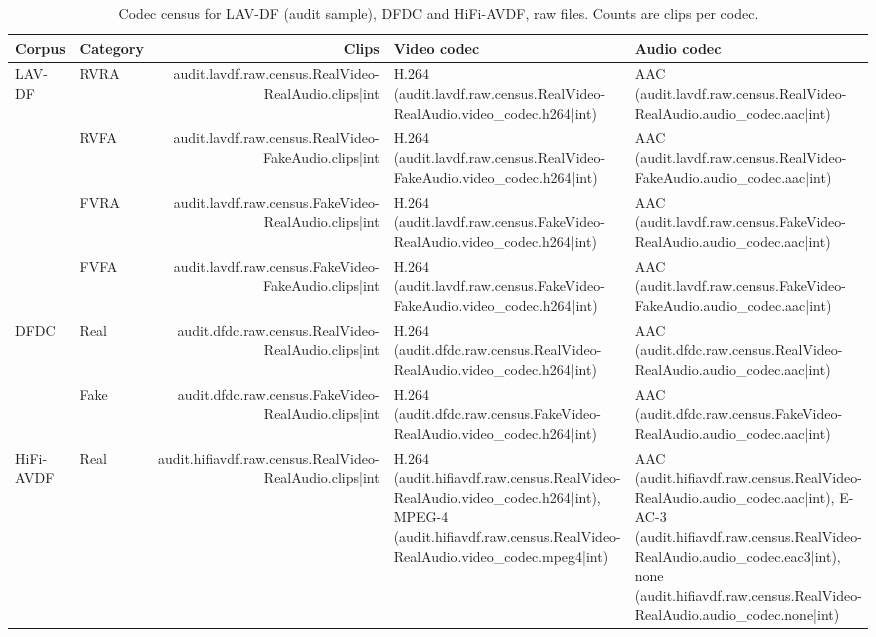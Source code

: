 \begin{table}[ht]
    \centering
    \small
    \caption{Codec census for LAV-DF (audit sample), DFDC and HiFi-AVDF, raw files. Counts are clips per codec.}
    \label{tab:census-others}
    \begin{tabularx}{\textwidth}{@{}l l r >{\raggedright\arraybackslash}X >{\raggedright\arraybackslash}X@{}}
        \toprule
        \textbf{Corpus} & \textbf{Category} & \textbf{Clips} & \textbf{Video codec} & \textbf{Audio codec} \\
        \midrule
        LAV-DF & RVRA & {{audit.lavdf.raw.census.RealVideo-RealAudio.clips|int}} & H.264 ({{audit.lavdf.raw.census.RealVideo-RealAudio.video_codec.h264|int}}) & AAC ({{audit.lavdf.raw.census.RealVideo-RealAudio.audio_codec.aac|int}}) \\
               & RVFA & {{audit.lavdf.raw.census.RealVideo-FakeAudio.clips|int}} & H.264 ({{audit.lavdf.raw.census.RealVideo-FakeAudio.video_codec.h264|int}}) & AAC ({{audit.lavdf.raw.census.RealVideo-FakeAudio.audio_codec.aac|int}}) \\
               & FVRA & {{audit.lavdf.raw.census.FakeVideo-RealAudio.clips|int}} & H.264 ({{audit.lavdf.raw.census.FakeVideo-RealAudio.video_codec.h264|int}}) & AAC ({{audit.lavdf.raw.census.FakeVideo-RealAudio.audio_codec.aac|int}}) \\
               & FVFA & {{audit.lavdf.raw.census.FakeVideo-FakeAudio.clips|int}} & H.264 ({{audit.lavdf.raw.census.FakeVideo-FakeAudio.video_codec.h264|int}}) & AAC ({{audit.lavdf.raw.census.FakeVideo-FakeAudio.audio_codec.aac|int}}) \\
        \midrule
        DFDC & Real & {{audit.dfdc.raw.census.RealVideo-RealAudio.clips|int}} & H.264 ({{audit.dfdc.raw.census.RealVideo-RealAudio.video_codec.h264|int}}) & AAC ({{audit.dfdc.raw.census.RealVideo-RealAudio.audio_codec.aac|int}}) \\
             & Fake & {{audit.dfdc.raw.census.FakeVideo-RealAudio.clips|int}} & H.264 ({{audit.dfdc.raw.census.FakeVideo-RealAudio.video_codec.h264|int}}) & AAC ({{audit.dfdc.raw.census.FakeVideo-RealAudio.audio_codec.aac|int}}) \\
        \midrule
        HiFi-AVDF & Real & {{audit.hifiavdf.raw.census.RealVideo-RealAudio.clips|int}} & H.264 ({{audit.hifiavdf.raw.census.RealVideo-RealAudio.video_codec.h264|int}}), MPEG-4 ({{audit.hifiavdf.raw.census.RealVideo-RealAudio.video_codec.mpeg4|int}}) & AAC ({{audit.hifiavdf.raw.census.RealVideo-RealAudio.audio_codec.aac|int}}), E-AC-3 ({{audit.hifiavdf.raw.census.RealVideo-RealAudio.audio_codec.eac3|int}}), none ({{audit.hifiavdf.raw.census.RealVideo-RealAudio.audio_codec.none|int}}) \\

\end{tabularx}
\end{table}
